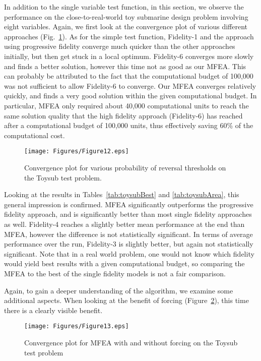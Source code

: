 In addition to the single variable test function, in this section, we observe the performance on the close-to-real-world toy submarine design problem involving eight variables. Again, we first look at the convergence plot of various different approaches (Fig.~\ref{fig:toysub}). As for the simple test function, Fidelity-1 and the approach using progressive fidelity converge much quicker than the other approaches initially, but then get stuck in a local optimum. Fidelity-6 converges more slowly and finds a better solution, however this time not as good as our MFEA. This can probably be attributed to the fact that the computational budget of 100,000 was not sufficient to allow Fidelity-6 to converge. Our MFEA converges relatively quickly, and finds a very good solution within the given computational budget. In particular, MFEA only required about 40,000 computational units to reach the same solution quality that the high fidelity approach (Fidelity-6) has reached after a computational budget of 100,000 units, thus effectively saving 60\% of the computational cost.

\begin{figure}[!htb]
	\centering
	\texttt{[image: Figures/Figure12.eps]}
	\caption{Convergence plot for various probability of reversal thresholds on the Toysub test problem.}
	\label{fig:toysub}
\end{figure} 

Looking at the results in Tables~\ref{tab:toysubBest} and \ref{tab:toysubArea}, this general impression is confirmed. MFEA significantly outperforms the progressive fidelity approach, and is significantly better than most single fidelity approaches as well. Fidelity-4 reaches a slightly better mean performance at the end than MFEA, however the difference is not statistically significant. In terms of average performance over the run, Fidelity-3 is slightly better, but again not statistically significant. Note that in a real world problem, one would not know which fidelity would yield best results with a given computational budget, so comparing the MFEA to the best of the single fidelity models is not a fair comparison.


Again, to gain a deeper understanding of the algorithm, we examine some additional aspects. When looking at the benefit of forcing (Figure~\ref{fig:toysubForcing}), this time there is a clearly visible benefit.

\begin{figure}[!htb]
	\centering
	\texttt{[image: Figures/Figure13.eps]}
	\caption{Convergence plot for MFEA with and without forcing on the Toysub test problem}
	\label{fig:toysubForcing}
\end{figure} 


